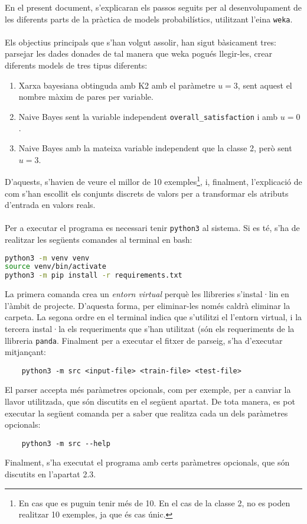 
En el present document, s'explicaran els passos seguits per al desenvolupament de les diferents parts de la pràctica de models probabilístics, utilitzant l'eina \texttt{weka}.\\\\
Els objectius principals que s'han volgut assolir, han sigut bàsicament tres: parsejar les dades donades de tal manera que weka pogués llegir-les, crear diferents models de tres tipus diferents: 
\begin{enumerate}
	\item Xarxa bayesiana obtinguda amb K2 amb el paràmetre $u=3$, sent aquest el nombre màxim de pares per variable.
	\item Naive Bayes sent la variable independent \texttt{overall\_satisfaction} i amb $u=0$.
	\item Naive Bayes amb la mateixa variable independent que la classe 2, però sent $u=3$.
\end{enumerate}
D'aquests, s'havien de veure el millor de 10 exemples\footnote{En cas que es puguin tenir més de 10. En el cas de la classe 2, no es poden realitzar 10 exemples, ja que és cas únic.}, i, finalment, l'explicació de com s'han escollit els conjunts discrets de valors per a transformar els atributs d'entrada en valors reals.\\
\\
Per a executar el programa es necessari tenir \texttt{python3} al sistema. Si es té,
s'ha de realitzar les següents comandes al terminal en bash:
\begin{lstlisting}[language=bash]
python3 -m venv venv
source venv/bin/activate
python3 -m pip install -r requirements.txt
\end{lstlisting}
La primera comanda crea un \textit{entorn virtual} perquè les llibreries s'instal·lin en l'àmbit de projecte. D'aquesta
forma, per eliminar-les només caldrà eliminar la carpeta. La segona ordre en el terminal 
indica que s'utilitzi el l'entorn virtual, i la tercera instal·la els requeriments que s'han 
utilitzat (són els requeriments de la llibreria \texttt{panda}. Finalment per a executar el fitxer
de parseig, s'ha d'executar mitjançant:
\begin{verbatim}
	python3 -m src <input-file> <train-file> <test-file>
\end{verbatim}
El parser accepta més paràmetres opcionals, com per exemple, per a canviar la llavor utilitzada,
que són discutits en el següent apartat. De tota manera, es pot executar la següent comanda per
a saber que realitza cada un dels paràmetres opcionals:
\begin{verbatim}
	python3 -m src --help
\end{verbatim}
Finalment, s'ha executat el programa amb certs paràmetres opcionals, que són discutits en 
l'apartat 2.3.
